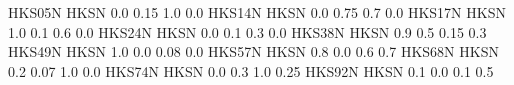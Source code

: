  {HKS05N} {HKS\SpotSpace N} {0.0 0.15 1.0 0.0}
 {HKS14N} {HKS\SpotSpace N} {0.0 0.75 0.7 0.0}
 {HKS17N} {HKS\SpotSpace N} {1.0 0.1 0.6 0.0}
 {HKS24N} {HKS\SpotSpace N} {0.0 0.1 0.3 0.0}
 {HKS38N} {HKS\SpotSpace N} {0.9 0.5 0.15 0.3}
 {HKS49N} {HKS\SpotSpace N} {1.0 0.0 0.08 0.0}
 {HKS57N} {HKS\SpotSpace N} {0.8 0.0 0.6 0.7}
 {HKS68N} {HKS\SpotSpace N} {0.2 0.07 1.0 0.0}
 {HKS74N} {HKS\SpotSpace N} {0.0 0.3 1.0 0.25}
 {HKS92N} {HKS\SpotSpace N} {0.1 0.0 0.1 0.5}

